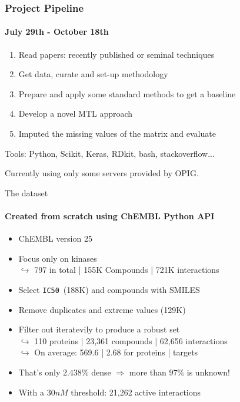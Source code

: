 \documentclass[11pt]{beamer}
\newcommand{\icfifty}{\texttt{IC50}}
\begin{document}
\begin{frame}
\frametitle{Project Pipeline}
\framesubtitle{July 29th - October 18th}
\begin{enumerate}
\setlength\itemsep{1em}
	\item Read papers: recently published or seminal techniques
	\item Get data, curate and set-up methodology
	\item Prepare and apply some standard methods to get a baseline
	\item Develop a novel MTL approach
	\item Imputed the missing values of the matrix and evaluate
	\pause
\end{enumerate}
\begin{center}
	Tools: Python, Scikit, Keras, RDkit, bash, stackoverflow...
\end{center}
\begin{center}
    Currently using only some servers provided by OPIG.
\end{center}
\end{frame}


\begin{frame}{The dataset}
\framesubtitle{Created from scratch using ChEMBL Python API}
\begin{itemize}
    \item ChEMBL version 25
    \item Focus only on kinases \\ 
    $\hookrightarrow$ 797 in total | 155K Compounds | 721K  interactions
    \pause
    \item Select \icfifty \ (188K) and compounds with SMILES
    \item Remove duplicates and extreme values (129K)
    \pause
    \item Filter out iteratevily to produce a robust set\\
    $\hookrightarrow$ 110 proteins | 23,361 compounds | 62,656 interactions\\
    $\hookrightarrow$ On average: 569.6 | 2.68 for proteins | targets
    \pause
    \item That's only $2.438\%$ dense $\Rightarrow $ more than $97\%$ is unknown!
    \pause
    \item With a $30nM$ threshold: 21,262 active interactions
\end{itemize}
\end{frame}
\end{document}
